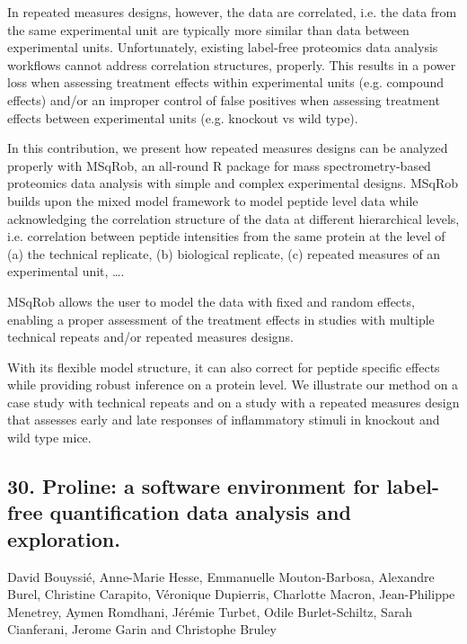 In repeated measures designs, however, the data are correlated, i.e. the data from the same experimental unit are typically more similar than data between experimental units.
Unfortunately, existing label-free proteomics data analysis workflows cannot address correlation structures, properly.
This results in a power loss when assessing treatment effects within experimental units (e.g. compound effects) and/or an improper control of false positives when assessing treatment effects between experimental units (e.g. knockout vs wild type).

In this contribution, we present how repeated measures designs can be analyzed properly with MSqRob, an all-round R package for mass spectrometry-based proteomics data analysis with simple and complex experimental designs.
MSqRob builds upon the mixed model framework to model peptide level data while acknowledging the correlation structure of the data at different hierarchical levels, i.e. correlation between peptide intensities from the same protein at the level of (a) the technical replicate, (b) biological replicate, (c) repeated measures of an experimental unit, ….

MSqRob allows the user to model the data with fixed and random effects, enabling a proper assessment of the treatment effects in studies with multiple technical repeats and/or repeated measures designs.

With its flexible model structure, it can also correct for peptide specific effects while providing robust inference on a protein level.
We illustrate our method on a case study with technical repeats and on a study with a repeated measures design that assesses early and late responses of inflammatory stimuli in knockout and wild type mice.

\subsection*{\color{eubicRed} 30. Proline: a software environment for label-free quantification data analysis and exploration.}
{\color{eubicGray}David Bouyssié, Anne-Marie Hesse, Emmanuelle Mouton-Barbosa, Alexandre Burel, Christine Carapito, Véronique Dupierris, Charlotte Macron, Jean-Philippe Menetrey, Aymen Romdhani, Jérémie Turbet, Odile Burlet-Schiltz, Sarah Cianferani, Jerome Garin and Christophe Bruley}

